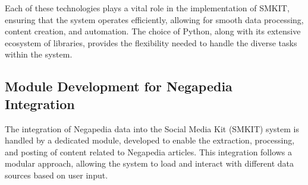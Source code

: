 Each of these technologies plays a vital role in the implementation of SMKIT, ensuring that the system operates efficiently, allowing for smooth data processing, content creation, and automation. The choice of Python, along with its extensive ecosystem of libraries, provides the flexibility needed to handle the diverse tasks within the system.

\subsection{Module Development for Negapedia Integration}
\label{subsec:module_development_for_negapedia_integration}
The integration of Negapedia data into the Social Media Kit (SMKIT) system is handled by a dedicated module, developed to enable the extraction, processing, and posting of content related to Negapedia articles. This integration follows a modular approach, allowing the system to load and interact with different data sources based on user input.


